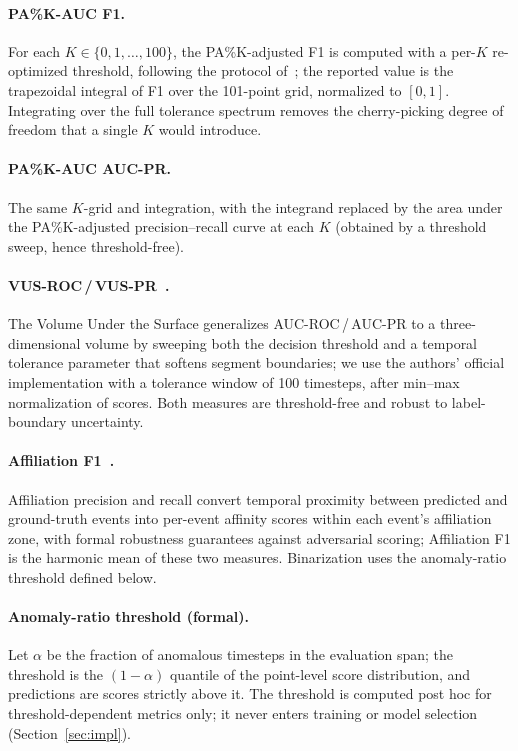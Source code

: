 \paragraph{PA\%K-AUC F1.}
For each $K \in \{0,1,\ldots,100\}$, the PA\%K-adjusted F1 is computed with a per-$K$
re-optimized threshold, following the protocol of~\cite{kim2022rigorous}; the reported value is
the trapezoidal integral of F1 over the 101-point grid, normalized to $[0,1]$.
Integrating over the full tolerance spectrum removes the cherry-picking degree of freedom that a
single $K$ would introduce.

\paragraph{PA\%K-AUC AUC-PR.}
The same $K$-grid and integration, with the integrand replaced by the area under the PA\%K-adjusted
precision--recall curve at each $K$ (obtained by a threshold sweep, hence threshold-free).

\paragraph{VUS-ROC\,/\,VUS-PR~\cite{paparrizos2022vus}.}
The Volume Under the Surface generalizes AUC-ROC\,/\,AUC-PR to a three-dimensional volume by
sweeping both the decision threshold and a temporal tolerance parameter that softens segment
boundaries; we use the authors' official implementation with a tolerance window of 100 timesteps,
after min--max normalization of scores.
Both measures are threshold-free and robust to label-boundary uncertainty.

\paragraph{Affiliation F1~\cite{huet2022affiliation}.}
Affiliation precision and recall convert temporal proximity between predicted and ground-truth
events into per-event affinity scores within each event's affiliation zone, with formal
robustness guarantees against adversarial scoring; Affiliation F1 is the harmonic mean of
these two measures.
Binarization uses the anomaly-ratio threshold defined below.

\paragraph{Anomaly-ratio threshold (formal).}
Let $\alpha$ be the fraction of anomalous timesteps in the evaluation span; the threshold is the
$(1-\alpha)$ quantile of the point-level score distribution, and predictions are scores strictly
above it.
The threshold is computed post hoc for threshold-dependent metrics only; it never enters
training or model selection (Section~\ref{sec:impl}).

